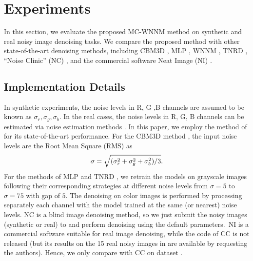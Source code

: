 \documentclass[10pt,twocolumn,letterpaper,sort&compress]{article}
\begin{document}
\section{Experiments}
In this section, we evaluate the proposed MC-WNNM method on synthetic and real noisy image denoising tasks. We compare the proposed method with other state-of-the-art denoising methods, including CBM3D \cite{cbm3d}, MLP \cite{mlp}, WNNM \cite{wnnm}, TNRD \cite{chen2015learning}, ``Noise Clinic'' (NC) \cite{noiseclinic,ncwebsite}, and the commercial software Neat Image (NI) \cite{neatimage}.

\subsection{Implementation Details}
In synthetic experiments, the noise levels in R, G ,B channels are assumed to be known as $\sigma_{r}, \sigma_{g}, \sigma_{b}$. In the real cases, the noise levels in R, G, B channels can be estimated via noise estimation methods \cite{noiselevel,Chen2015ICCV}. In this paper, we employ the method of \cite{Chen2015ICCV} for its state-of-the-art performance. For the CBM3D method \cite{cbm3d}, the input noise levels are the Root Mean Square (RMS) as 
\vspace{-3mm}
\begin{equation}
\label{e21}
\vspace{-3mm}
\sigma = \sqrt{(\sigma_{r}^{2}+\sigma_{g}^{2}+\sigma_{b}^{2})/3}.
\end{equation}
For the methods of MLP \cite{mlp} and TNRD \cite{chen2015learning}, we retrain the models on grayscale images following their corresponding strategies at different noise levels from $\sigma=5$ to $\sigma=75$ with gap of $5$. The denoising on color images is performed by processing separately each channel with the model trained at the same (or nearest) noise levels. NC \cite{noiseclinic,ncwebsite} is a blind image denoising method, so we just submit the noisy images (synthetic or real) to \cite{ncwebsite} and perform denoising using the default parameters.\ NI \cite{neatimage} is a commercial software suitable for real image denoising, while the code of CC \cite{crosschannel2016} is not released (but its results on the 15 real noisy images in \cite{crosschannel2016} are available by requesting the authors). Hence, we only compare with CC on dataset \cite{crosschannel2016}. 
\end{document}
